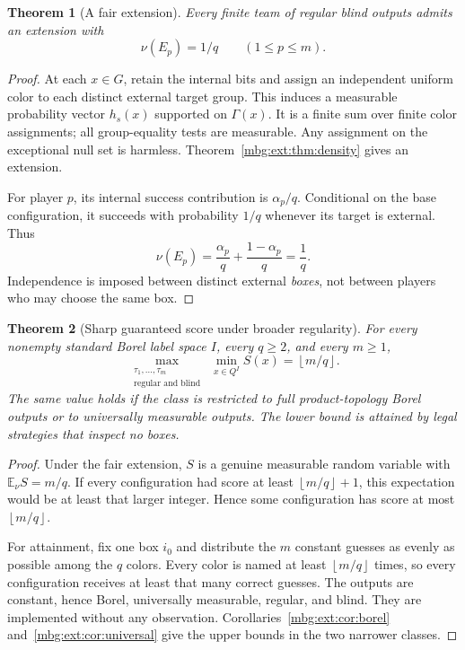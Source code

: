 \documentclass[11pt,letterpaper]{article}
\newtheorem{theorem}{Theorem}[section]
\theoremstyle{definition}
\newcommand{\E}{\mathbb E}
\newcommand{\floor}[1]{\left\lfloor #1\right\rfloor}
\begin{document}
\begin{theorem}[A fair extension]
\label{mbg:ext:thm:fair-extension}
Every finite team of regular blind outputs admits an extension with
\[
\nu(E_p)=1/q\qquad(1\le p\le m).
\]
\end{theorem}
\begin{proof}
At each $x\in G$, retain the internal bits and assign an independent uniform color to each distinct external target group. This induces a measurable probability vector $h_s(x)$ supported on $\Gamma(x)$. It is a finite sum over finite color assignments; all group-equality tests are measurable. Any assignment on the exceptional null set is harmless. Theorem~\ref{mbg:ext:thm:density} gives an extension.

For player $p$, its internal success contribution is $\alpha_p/q$. Conditional on the base configuration, it succeeds with probability $1/q$ whenever its target is external. Thus
\[
\nu(E_p)=\frac{\alpha_p}{q}+\frac{1-\alpha_p}{q}=\frac1q.
\]
Independence is imposed between distinct external \emph{boxes}, not between players who may choose the same box.
\end{proof}

\begin{theorem}[Sharp guaranteed score under broader regularity]
\label{mbg:ext:thm:minimax}
For every nonempty standard Borel label space $I$, every $q\ge2$, and every $m\ge1$,
\begin{equation}
\boxed{\qquad
\max_{\substack{\tau_1,\ldots,\tau_m\\
\text{regular and blind}}}\ \min_{x\in Q^I}S(x)
=\floor{m/q}.
\qquad}
\label{mbg:ext:eq:minimax}
\end{equation}
The same value holds if the class is restricted to full product-topology Borel outputs or to universally measurable outputs. The lower bound is attained by legal strategies that inspect no boxes.
\end{theorem}
\begin{proof}
Under the fair extension, $S$ is a genuine measurable random variable with $\E_\nu S=m/q$. If every configuration had score at least $\floor{m/q}+1$, this expectation would be at least that larger integer. Hence some configuration has score at most $\floor{m/q}$.

For attainment, fix one box $i_0$ and distribute the $m$ constant guesses as evenly as possible among the $q$ colors. Every color is named at least $\floor{m/q}$ times, so every configuration receives at least that many correct guesses. The outputs are constant, hence Borel, universally measurable, regular, and blind. They are implemented without any observation. Corollaries~\ref{mbg:ext:cor:borel} and~\ref{mbg:ext:cor:universal} give the upper bounds in the two narrower classes.
\end{proof}
\end{document}
